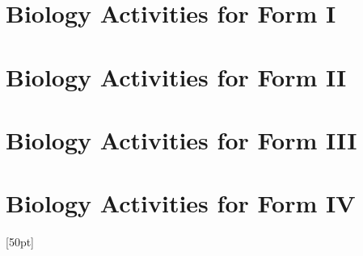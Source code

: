 \documentclass[10pt,a4paper]{report}
\begin{document}

%
%

\tableofcontents




\chapter{Biology Activities for Form I}
%

\chapter{Biology Activities for Form II}

\chapter{Biology Activities for Form III}

\chapter{Biology Activities for Form IV}





\appendix

\setcounter{secnumdepth}{2}

\titlespacing*{\chapter}{0pt}{-10pt}{0pt}[50pt]
\titleformat{\chapter}[display]{\normalfont\huge\bfseries}{\chaptertitlename\thechapter}{20pt}{\Huge}




\end{document}
